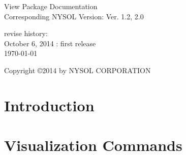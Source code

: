 \documentclass[a4paper]{book}
\begin{document}
\begin{titlepage}
\begin{center}
{\huge View Package Documentation}\\
\vspace{10truept}
{\normalsize Corresponding NYSOL Version: Ver. 1.2, 2.0}\\
\vspace{1cm}

revise history:\\
October 6, 2014 : first release\\
\vspace{18cm}
{\small \today}

{\small Copyright \copyright 2014 by NYSOL CORPORATION}
\end{center}
\end{titlepage}

\setcounter{tocdepth}{1}
\tableofcontents


\chapter{Introduction}



\chapter{Visualization Commands}






%
\end{document}
